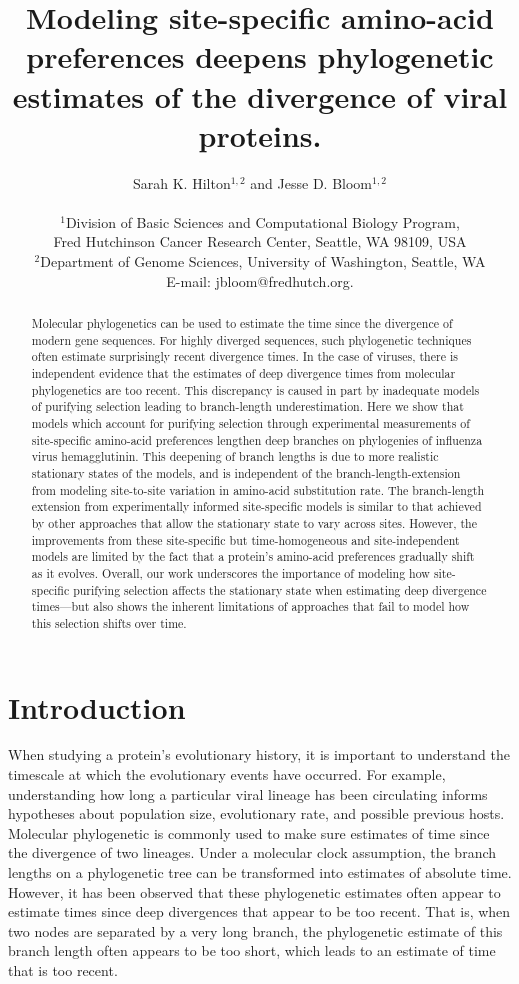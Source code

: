 \documentclass[11pt]{article}
\title{Modeling site-specific amino-acid preferences deepens phylogenetic estimates of the divergence of viral proteins.}
\author
{Sarah K. Hilton$^{1,2}$  and Jesse D. Bloom$^{1,2}$\\
\\
\normalsize{$^1$Division of Basic Sciences and Computational Biology Program,}\\
\normalsize{Fred Hutchinson Cancer Research Center, Seattle, WA 98109, USA}\\
\normalsize{$^2$Department of Genome Sciences, University of Washington, Seattle, WA}\\
\normalsize{E-mail:  jbloom@fredhutch.org.}\\
}
\date{}
\begin{document}
 


\maketitle 


\begin{abstract}
\noindent  
Molecular phylogenetics can be used to estimate the time since the divergence of modern gene sequences.
For highly diverged sequences, such phylogenetic techniques often estimate surprisingly recent divergence times. 
In the case of viruses, there is independent evidence that the estimates of deep divergence times from molecular phylogenetics are too recent.
This discrepancy is caused in part by inadequate models of purifying selection leading to branch-length underestimation.
Here we show that models which account for purifying selection through experimental measurements of site-specific amino-acid preferences lengthen deep branches on phylogenies of influenza virus hemagglutinin.
This deepening of branch lengths is due to more realistic stationary states of the models, and is independent of the branch-length-extension from modeling site-to-site variation in amino-acid substitution rate.
The branch-length extension from experimentally informed site-specific models is similar to that achieved by other approaches that allow the stationary state to vary across sites.
However, the improvements from these site-specific but time-homogeneous and site-independent models are limited by the fact that a protein's amino-acid preferences gradually shift as it evolves.
Overall, our work underscores the importance of modeling how site-specific purifying selection affects the stationary state when estimating deep divergence times---but also shows the inherent limitations of approaches that fail to model how this selection shifts over time. 
\end{abstract}

\clearpage

\section*{Introduction} 

When studying a protein's evolutionary history, it is important to understand the timescale at which the evolutionary events have occurred. 
For example, understanding how long a particular viral lineage has been circulating informs hypotheses about population size, evolutionary rate, and possible previous hosts. Molecular phylogenetic is commonly used to make sure estimates of time since the divergence of two lineages. 
Under a molecular clock assumption, the branch lengths on a phylogenetic tree can be transformed into estimates of absolute time. 
However, it has been observed that these phylogenetic estimates often appear to estimate times since deep divergences that appear to be too recent. 
That is, when two nodes are separated by a very long branch, the phylogenetic estimate of this branch length often appears to be too short, which leads to an estimate of time that is too recent. 
\end{document}
